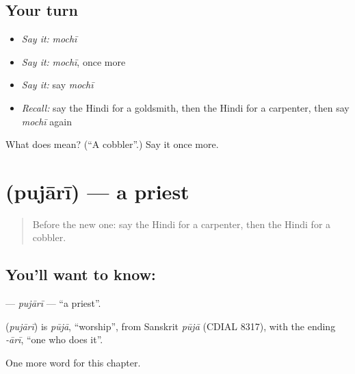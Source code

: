 \subsection*{Your turn}
\begin{itemize}
\raggedright
  \item \emph{Say it:} \emph{mochī}
  \item \emph{Say it:} \emph{mochī}, once more
  \item \emph{Say it:} say \emph{mochī}
  \item \emph{Recall:} say the Hindi for a goldsmith, then the Hindi for a carpenter, then say \emph{mochī} again
\end{itemize}

\begin{tcolorbox}[breakable,colback=teal!4,colframe=teal!35!black,title={Before you move on}]
What does  mean? (\textquotedblleft{}A cobbler\textquotedblright{}.) Say it once more.
\end{tcolorbox}
\section[\texorpdfstring{\hi{पुजारी} (pujārī)}{पुजारी (pujārī)}]{ (pujārī) — a priest}

\label{lesson:HI-C262-pujari}



\begin{quote}
Before the new one: say the Hindi for a carpenter, then the Hindi for a cobbler.
\end{quote}

\subsection*{You'll want to know: }
\textbf{} — \emph{pujārī} — \textquotedblleft{}a priest\textquotedblright{}.

\begin{cousinweb}
\textbf{} (\emph{pujārī}) is \emph{pūjā}, \textquotedblleft{}worship\textquotedblright{}, from Sanskrit \emph{pūjā} (CDIAL 8317), with the ending \emph{-ārī}, \textquotedblleft{}one who does it\textquotedblright{}.
\end{cousinweb}

\begin{grammarlens}[title={What you've built}]
One more word for this chapter.
\end{grammarlens}

